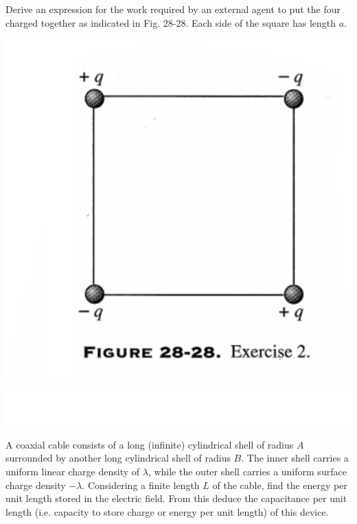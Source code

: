 \documentclass[12pt,letterpaper,boxed,cm]{hmcpset}
\begin{document}

\begin{problem}[28-E2]
Derive an expression for the work required by an external agent to put the four charged together as indicated in Fig. 28-28. Each side of the square has length $a$.
\begin{center}
	\includegraphics[scale=0.7]{01.png}
\end{center}
\end{problem}
\begin{solution}
\end{solution}
\newpage


\begin{problem}[SUP3]
	A coaxial cable consists of a long (infinite) cylindrical shell of radius $A$ surrounded by another long cylindrical shell of radius $B$. The inner shell carries a uniform linear charge density of $\lambda$, while the outer shell carries a uniform surface charge density $-\lambda$. Considering a finite length $L$ of the cable, find the energy per unit length stored in the electric field. From this deduce the capacitance per unit length (i.e. capacity to store charge or energy per unit length) of this device.
\end{problem}
\begin{solution}
\end{solution}
\end{document}
